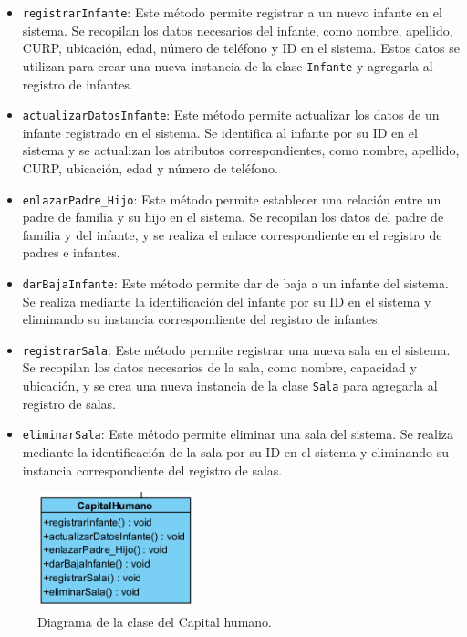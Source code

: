 \begin{itemize}
\item \texttt{registrarInfante}: Este método permite registrar a un nuevo infante en el sistema. Se recopilan los datos necesarios del infante, como nombre, apellido, CURP, ubicación, edad, número de teléfono y ID en el sistema. Estos datos se utilizan para crear una nueva instancia de la clase \texttt{Infante} y agregarla al registro de infantes.

\item \texttt{actualizarDatosInfante}: Este método permite actualizar los datos de un infante registrado en el sistema. Se identifica al infante por su ID en el sistema y se actualizan los atributos correspondientes, como nombre, apellido, CURP, ubicación, edad y número de teléfono.

\item \texttt{enlazarPadre\_Hijo}: Este método permite establecer una relación entre un padre de familia y su hijo en el sistema. Se recopilan los datos del padre de familia y del infante, y se realiza el enlace correspondiente en el registro de padres e infantes.

\item \texttt{darBajaInfante}: Este método permite dar de baja a un infante del sistema. Se realiza mediante la identificación del infante por su ID en el sistema y eliminando su instancia correspondiente del registro de infantes.

\item \texttt{registrarSala}: Este método permite registrar una nueva sala en el sistema. Se recopilan los datos necesarios de la sala, como nombre, capacidad y ubicación, y se crea una nueva instancia de la clase \texttt{Sala} para agregarla al registro de salas.

\item \texttt{eliminarSala}: Este método permite eliminar una sala del sistema. Se realiza mediante la identificación de la sala por su ID en el sistema y eliminando su instancia correspondiente del registro de salas.
\end{itemize}

\begin{figure}[htbp]
\centering
\includegraphics[width=0.4\textwidth]{images/arqui/capitalhumano.png}
\caption{Diagrama de la clase del Capital humano.}
\label{fig:entidadCaH}
\end{figure}


